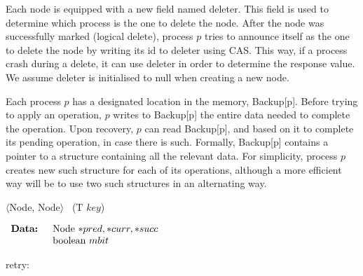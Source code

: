 Each node is equipped with a new field named deleter. This field is used to determine which process is the one to delete the node. After the node was successfully marked (logical delete), process $p$ tries to announce itself as the one to delete the node by writing its id to deleter using CAS. This way, if a process crash during a delete, it can use deleter in order to determine the response value. We assume deleter is initialised to null when creating a new node.

Each process $p$ has a designated location in the memory, Backup[p]. Before trying to apply an operation, $p$ writes to Backup[p] the entire data needed to complete the operation. Upon recovery, $p$ can read Backup[p], and based on it to complete its pending operation, in case there is such. Formally, Backup[p] contains a pointer to a structure containing all the relevant data.
For simplicity, process $p$ creates new such structure for each of its operations, although a more efficient way will be to use two such structures in an alternating way. 


\begin{algorithm}[b]
	\footnotesize
	
	\caption{$\langle$Node, Node$\rangle$ \search\ (T $key$)}
	
	$ \begin{array}{rl}
	\mbox{\textbf{Data: }}	&	\mbox{Node $*pred, *curr, *succ$} \\
							&	\mbox{boolean $mbit$}
	\end{array} $
	
	
	retry: 
	
\end{algorithm}

